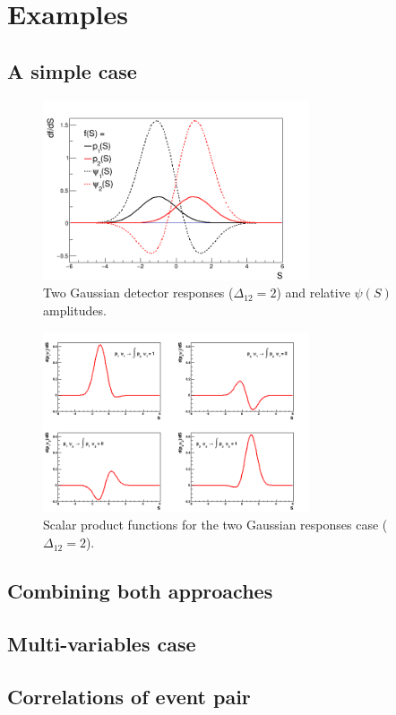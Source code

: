 \section{Examples}
\subsection{A simple case}

\begin{figure}[!htb]
\centering
\includegraphics[width=0.7\textwidth]{../png/figGaus2.png}
\caption{Two Gaussian detector responses ($\Delta_{12} = 2$) and relative
  $\psi(S)$ amplitudes.}
\label{fig:Gaus2}
\end{figure}

\begin{figure}[!htb]
\centering
\includegraphics[width=0.7\textwidth]{../png/figSPgaus.png}
\caption{Scalar product functions for the two Gaussian responses case ($\Delta_{12} = 2$).}
\label{fig:Gaus2}
\end{figure}

\subsection{Combining both approaches}

\subsection{Multi-variables case}

\subsection{Correlations of event pair}

